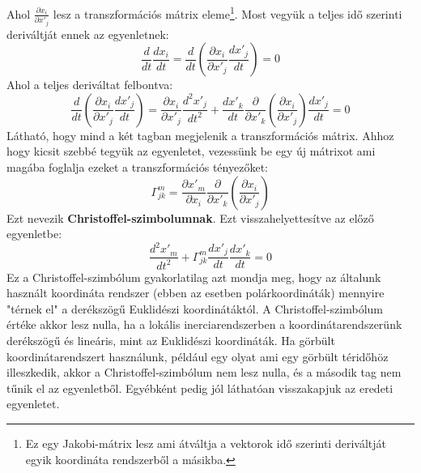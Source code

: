 \documentclass[../main.tex]{subfiles}
\begin{document}
Ahol $\frac{\partial x_i}{\partial x'_j}$ lesz a transzformációs mátrix eleme\footnote{
    Ez egy Jakobi-mátrix lesz ami átváltja a vektorok idő szerinti deriváltját egyik koordináta rendszerből a másikba.
}. Most vegyük a teljes idő szerinti deriváltját ennek az egyenletnek:
\begin{equation}
    \frac{d}{d t} \frac{d x_i}{d t} = \frac{d}{d t} \left(\frac{\partial x_i}{\partial x'_j} \frac{d x'_j}{d t}\right) = 0
\end{equation}
Ahol a teljes deriváltat felbontva:
\begin{equation}
    \frac{d}{d t} \left(\frac{\partial x_i}{\partial x'_j} \frac{d x'_j}{d t}\right) = \frac{\partial x_i}{\partial x'_j} \frac{d^2 x'_j}{d t^2} + \frac{d x'_k}{d t} \frac{\partial}{\partial x'_k} \left(\frac{\partial x_i}{\partial x'_j}\right) \frac{d x'_j}{d t} = 0
\end{equation}
Látható, hogy mind a két tagban megjelenik a transzformációs mátrix. Ahhoz hogy kicsit szebbé tegyük az egyenletet, vezessünk be egy új mátrixot ami magába foglalja ezeket a transzformációs tényezőket:
\begin{equation}
    \Gamma^m_{jk} = \frac{\partial x'_m}{\partial x_i} \frac{\partial}{\partial x'_k} \left(\frac{\partial x_i}{\partial x'_j}\right)
\end{equation}
Ezt nevezik \textbf{Christoffel-szimbolumnak}. Ezt visszahelyettesítve az előző egyenletbe:
\begin{equation}
    \frac{d^2 x'_m}{d t^2} + \Gamma^m_{jk} \frac{d x'_j}{d t} \frac{d x'_k}{d t} = 0
\end{equation}
Ez a Christoffel-szimbólum gyakorlatilag azt mondja meg, hogy az általunk használt koordináta rendszer (ebben az esetben polárkoordináták) mennyire "térnek el" a derékszögű Euklidészi koordinátáktól.
A Christoffel-szimbólum értéke akkor lesz nulla, ha a lokális inerciarendszerben a koordinátarendszerünk derékszögű és lineáris, mint az Euklidészi koordináták. Ha görbült koordinátarendszert használunk,
például egy olyat ami egy görbült téridőhöz illeszkedik, akkor a Christoffel-szimbólum nem lesz nulla, és a második tag nem tűnik el az egyenletből. Egyébként pedig jól láthatóan visszakapjuk az eredeti
egyenletet.
\end{document}
